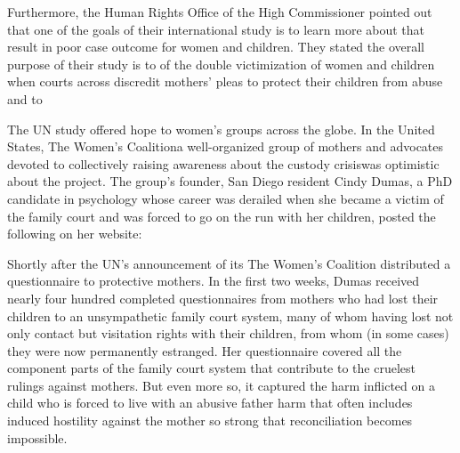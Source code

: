 Furthermore, the Human Rights Office of the High Commissioner
pointed out that one of the goals of their international study is to learn
more about  that result in poor
case outcome for women and children. They stated the overall purpose
of their study is to  of the
double victimization of women and children when courts across  discredit mothers' pleas
to protect their children from abuse and to \hspace{1pt} \pfl{}

The UN study offered hope to women's groups across the globe. In
the United States, The Women's Coalition\mdash{}a well-organized group of
mothers and advocates devoted to collectively raising awareness about
the custody crisis\mdash{}was optimistic about the project. The group's founder,
San Diego resident Cindy Dumas, a PhD candidate in psychology whose
career was derailed when she became a victim of the family court and
was forced to go on the run with her children, posted the following on
her website:

 \pfl{}

Shortly after the UN's announcement of its  The Women's Coalition 
distributed a questionnaire to protective mothers.
In the first two weeks, Dumas received nearly four hundred
completed questionnaires from mothers who had lost their children to an
unsympathetic family court system, many of whom having lost not 
only contact but visitation rights with their children, 
from whom (in some cases) they were now permanently estranged.
Her questionnaire covered all
the component parts of the family court system that contribute to the
cruelest rulings against mothers. But even more so, it captured the harm
inflicted on a child who is forced to live with an abusive father\mdash{}
harm that often includes induced hostility against the mother so strong that
reconciliation becomes impossible. \pfl{}

